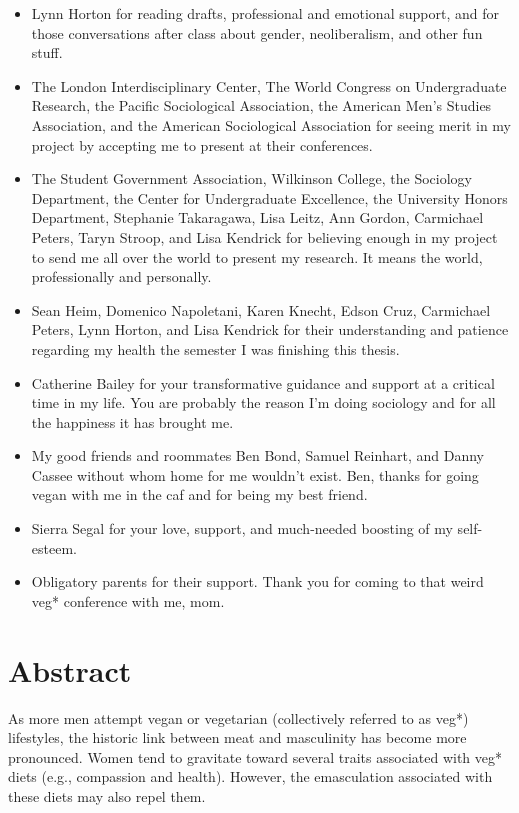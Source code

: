 \documentclass[twoside]{report}
\let\oldsection\section
\renewcommand\section{\clearpage\oldsection}
\begin{document}
\begin{itemize}
\item
  Lynn Horton for reading drafts, professional and emotional support,
  and for those conversations after class about gender, neoliberalism,
  and other fun stuff.
\item
  The London Interdisciplinary Center, The World Congress on
  Undergraduate Research, the Pacific Sociological Association, the
  American Men's Studies Association, and the American Sociological
  Association for seeing merit in my project by accepting me to present
  at their conferences.
\item
  The Student Government Association, Wilkinson College, the Sociology
  Department, the Center for Undergraduate Excellence, the University
  Honors Department, Stephanie Takaragawa, Lisa Leitz, Ann Gordon,
  Carmichael Peters, Taryn Stroop, and Lisa Kendrick for believing
  enough in my project to send me all over the world to present my
  research. It means the world, professionally and personally.
\item
  Sean Heim, Domenico Napoletani, Karen Knecht, Edson Cruz, Carmichael
  Peters, Lynn Horton, and Lisa Kendrick for their understanding and
  patience regarding my health the semester I was finishing this thesis.
\item
  Catherine Bailey for your transformative guidance and support at a
  critical time in my life. You are probably the reason I'm doing
  sociology and for all the happiness it has brought me.
\item
  My good friends and roommates Ben Bond, Samuel Reinhart, and Danny
  Cassee without whom home for me wouldn't exist. Ben, thanks for going
  vegan with me in the caf and for being my best friend.
\item
  Sierra Segal for your love, support, and much-needed boosting of my
  self-esteem.
\item
  Obligatory parents for their support. Thank you for coming to that
  weird veg* conference with me, mom.
\end{itemize}

\section{Abstract}

As more men attempt vegan or vegetarian (collectively referred to as
veg*) lifestyles, the historic link between meat and masculinity has
become more pronounced. Women tend to gravitate toward several traits
associated with veg* diets (e.g., compassion and health). However, the
emasculation associated with these diets may also repel them. 
\end{document}

